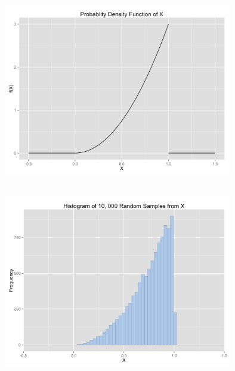 \documentclass[12pt]{article}
\begin{document}
 \begin{center}
\includegraphics[width=10cm, height=8cm]{density}
\end{center}
 
 \begin{center}
\includegraphics[width=10cm, height=8cm]{histogram}
\end{center}
\end{document}
